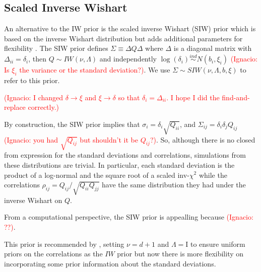 \documentclass[a4paper]{article}
\newcommand{\nacho}[1]{\textcolor{red}{(Ignacio: #1)}}
\newcommand{\I}{\mathrm{I}}
\begin{document}
\subsection{Scaled Inverse Wishart \label{sec:siw}}

An alternative to the IW prior is the scaled inverse Wishart (SIW) prior which is based on the inverse Wishart distribution but adds additional parameters for flexibility \citep{odomain}. The SIW prior defines $\Sigma \equiv \Delta Q \Delta $ where $\Delta$ is a diagonal matrix with $\Delta_{ii}=\delta_i$, then $Q \sim  IW(\nu, \Lambda)$ and independently $\log(\delta_i) \stackrel{ind} \sim N(b_i, \xi_i)$ \nacho{Is $\xi_i$ the variance or the standard deviation?}.  We use $\Sigma \sim SIW(\nu, \Lambda, b, \xi)$ to refer to this prior. 

\nacho{I changed $\delta\to\xi$ and $\xi\to\delta$ so that $\delta_i=\Delta_{ii}$. I hope I did the find-and-replace correctly.}

By construction, the SIW prior implies that $\sigma_i = \delta_i \sqrt{Q_{ii}}$, and $\Sigma_{ij}=\delta_i\delta_jQ_{ij}$ \nacho{you had $\sqrt{Q_{ij}}$ but shouldn't it be $Q_{ij}$?}. So, although there is no closed from expression for the standard deviations and correlations, simulations from these distributions are trivial. In particular, each standard deviation is the product of a log-normal and the square root of a scaled inv-$\chi^2$ while the correlations $\rho_{ij} = Q_{ij}/\sqrt{Q_{ii}Q_{jj}}$ have the same distribution they had under the inverse Wishart on $Q$.  

From a computational perspective, the SIW prior is appealling because \nacho{??}.

This prior is recommended by \cite{gelmanhill}, setting $\nu=d+1$ and $\Lambda=\I$ to ensure uniform priors on the correlations as the $IW$ prior but now there is more flexibility on incorporating some prior information about the standard deviations.
\end{document}
